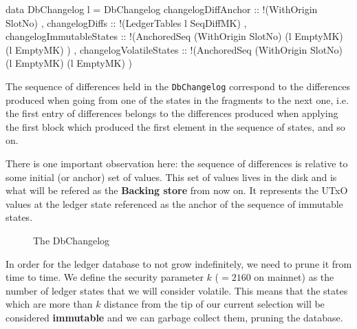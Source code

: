 \documentclass[11pt,a4paper]{article}
\newcommand{\htt}[1]{\texttt{#1}}
\theoremstyle{definition}
\begin{document}
\begin{code}
data DbChangelog l = DbChangelog {
    changelogDiffAnchor      :: !(WithOrigin SlotNo)
  , changelogDiffs           :: !(LedgerTables l SeqDiffMK)
  , changelogImmutableStates ::
      !(AnchoredSeq
          (WithOrigin SlotNo)
          (l EmptyMK)
          (l EmptyMK)
       )
  , changelogVolatileStates  ::
      !(AnchoredSeq
          (WithOrigin SlotNo)
          (l EmptyMK)
          (l EmptyMK)
       )
  }
\end{code}

The sequence of differences held in the \htt{DbChangelog} correspond to the
differences produced when going from one of the states in the fragments to the
next one, i.e. the first entry of differences belongs to the differences produced
when applying the first block which produced the first element in the sequence
of states, and so on.

There is one important observation here: the sequence of differences is relative
to some initial (or anchor) set of values. This set of values lives in the disk
and is what will be refered as the \textbf{Backing store} from now on. It
represents the UTxO values at the ledger state referenced as the anchor of the
sequence of immutable states.

\begin{figure}[h]
  \centering
  \caption{The DbChangelog}\label{fig:dbch}
\end{figure}

In order for the ledger database to not grow indefinitely, we need to prune it
from time to time. We define the security parameter $k$ ($= 2160$ on mainnet) as
the number of ledger states that we will consider volatile. This means that the
states which are more than $k$ distance from the tip of our current selection
will be considered \textbf{immutable} and we can garbage collect them, pruning
the database.
\end{document}
